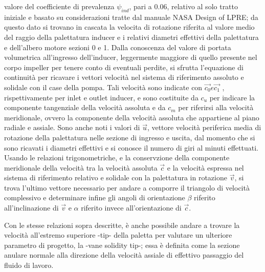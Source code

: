 valore del coefficiente di prevalenza $\psi_{ind}$, pari a $0.06$, relativo al solo tratto iniziale e basato su considerazioni tratte dal manuale NASA Design of LPRE; da questo dato si trovano in cascata la velocita di rotazione riferita al valore medio del raggio della palettatura inducer e i relativi diametri effettivi della palettatura e dell'albero motore sezioni 0 e 1. Dalla conoscenza del valore di portata volumetrica all'ingresso dell'inducer, leggermente maggiore di quello presente nel corpo impeller per tenere conto di eventuali perdite, si sfrutta l'equazione di continuità per ricavare i vettori velocità nel sistema di riferimento assoluto e solidale con il case della pompa. Tali velocità sono indicate con $\overrightarrow{c_0} e \overrightarrow{c_1}$ , rispettivamente per inlet e outlet inducer, e sono costituite da $c_u$ per indicare la componente tangenziale della velocità assoluta e da $c_m$ per riferirsi alla velocità meridionale, ovvero la componente della velocità assoluta che appartiene al piano radiale e assiale. Sono anche noti i valori di $\overrightarrow{u}$, vettore velocità periferica media di rotazione della palettatura nelle sezione di ingresso e uscita, dal momento che si sono ricavati i diametri effettivi e si conosce il numero di giri al minuti effettuati. Usando le relazioni trigonometriche, e la conservzione della componente meridionale della velocità tra la velocità assoluta $\overrightarrow{c}$ e la velocità espressa nel sistema di riferimento relativo e solidale con la palettatura in rotazione $\overrightarrow{v}$, si trova l'ultimo vettore necessario per andare a comporre il triangolo di velocità complessivo e determinare infine gli angoli di orientazione $\beta$ riferito all'inclinazione di  $\overrightarrow{v}$ e $\alpha$ riferito invece all'orientazione di $\overrightarrow{c}$.

Con le stesse relazioni sopra descritte, è anche possibile andare a trovare la velocità all'estremo superiore -tip- della paletta per valutare un ulteriore parametro di progetto, la -vane solidity tip-; essa è definita come la sezione anulare normale alla direzione della velocità assiale di effettivo passaggio del fluido di lavoro.
\\

